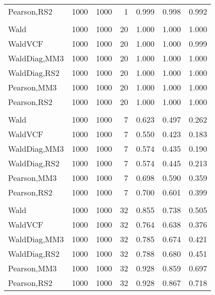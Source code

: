 \documentclass[
]{article}
\begin{document}
\begin{table}[H]
{\begin{tabular}[t]{lrrrrrr}
\hspace{1em}Pearson,RS2 & 1000 & 1000 & 1 & 0.999 & 0.998 & 0.992\\
\addlinespace[0.3em]
\multicolumn{7}{l}{\textbf{1F 15V}}\\
\hspace{1em}Wald & 1000 & 1000 & 20 & 1.000 & 1.000 & 1.000\\
\hspace{1em}WaldVCF & 1000 & 1000 & 20 & 1.000 & 1.000 & 0.999\\
\hspace{1em}WaldDiag,MM3 & 1000 & 1000 & 20 & 1.000 & 1.000 & 1.000\\
\hspace{1em}WaldDiag,RS2 & 1000 & 1000 & 20 & 1.000 & 1.000 & 1.000\\
\hspace{1em}Pearson,MM3 & 1000 & 1000 & 20 & 1.000 & 1.000 & 1.000\\
\hspace{1em}Pearson,RS2 & 1000 & 1000 & 20 & 1.000 & 1.000 & 1.000\\
\addlinespace[0.3em]
\multicolumn{7}{l}{\textbf{2F 10V}}\\
\hspace{1em}Wald & 1000 & 1000 & 7 & 0.623 & 0.497 & 0.262\\
\hspace{1em}WaldVCF & 1000 & 1000 & 7 & 0.550 & 0.423 & 0.183\\
\hspace{1em}WaldDiag,MM3 & 1000 & 1000 & 7 & 0.574 & 0.435 & 0.190\\
\hspace{1em}WaldDiag,RS2 & 1000 & 1000 & 7 & 0.574 & 0.445 & 0.213\\
\hspace{1em}Pearson,MM3 & 1000 & 1000 & 7 & 0.698 & 0.590 & 0.359\\
\hspace{1em}Pearson,RS2 & 1000 & 1000 & 7 & 0.700 & 0.601 & 0.399\\
\addlinespace[0.3em]
\multicolumn{7}{l}{\textbf{3F 15V}}\\
\hspace{1em}Wald & 1000 & 1000 & 32 & 0.855 & 0.738 & 0.505\\
\hspace{1em}WaldVCF & 1000 & 1000 & 32 & 0.764 & 0.638 & 0.376\\
\hspace{1em}WaldDiag,MM3 & 1000 & 1000 & 32 & 0.785 & 0.674 & 0.421\\
\hspace{1em}WaldDiag,RS2 & 1000 & 1000 & 32 & 0.788 & 0.680 & 0.451\\
\hspace{1em}Pearson,MM3 & 1000 & 1000 & 32 & 0.928 & 0.859 & 0.697\\
\hspace{1em}Pearson,RS2 & 1000 & 1000 & 32 & 0.928 & 0.867 & 0.718\\
\bottomrule
\end{tabular}}
\endgroup{}
\end{table}
\end{document}
